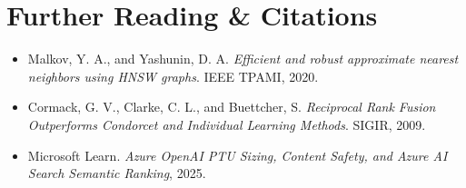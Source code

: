 \section{Further Reading \protect\& Citations}
\begin{itemize}[leftmargin=15pt]
  \item Malkov, Y. A., and Yashunin, D. A. \emph{Efficient and robust approximate nearest neighbors using HNSW graphs}. IEEE TPAMI, 2020.
  \item Cormack, G. V., Clarke, C. L., and Buettcher, S. \emph{Reciprocal Rank Fusion Outperforms Condorcet and Individual Learning Methods}. SIGIR, 2009.
  \item Microsoft Learn. \emph{Azure OpenAI PTU Sizing, Content Safety, and Azure AI Search Semantic Ranking}, 2025.
\end{itemize}
